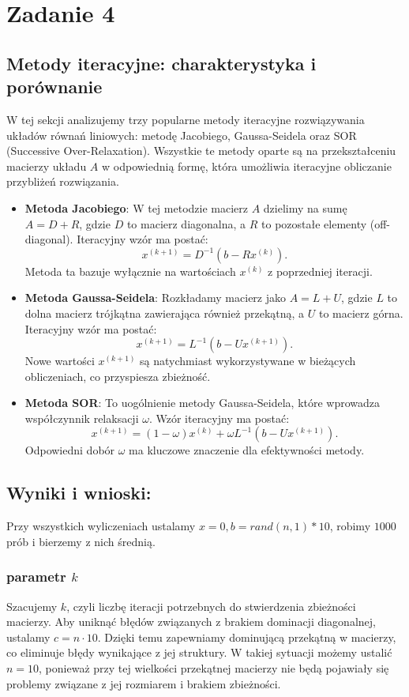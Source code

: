 \section{Zadanie 4}

\subsection{Metody iteracyjne: charakterystyka i porównanie}
W tej sekcji analizujemy trzy popularne metody iteracyjne rozwiązywania układów równań liniowych: metodę Jacobiego, Gaussa-Seidela oraz SOR (Successive Over-Relaxation). Wszystkie te metody oparte są na przekształceniu macierzy układu \( A \) w odpowiednią formę, która umożliwia iteracyjne obliczanie przybliżeń rozwiązania.  
\begin{itemize}
    \item \textbf{Metoda Jacobiego}: W tej metodzie macierz \( A \) dzielimy na sumę \( A = D + R \), gdzie \( D \) to macierz diagonalna, a \( R \) to pozostałe elementy (off-diagonal). Iteracyjny wzór ma postać:  
    \[
    x^{(k+1)} = D^{-1}(b - Rx^{(k)}).
    \]  
    Metoda ta bazuje wyłącznie na wartościach \( x^{(k)} \) z poprzedniej iteracji.  

    \item \textbf{Metoda Gaussa-Seidela}: Rozkładamy macierz jako \( A = L + U \), gdzie \( L \) to dolna macierz trójkątna zawierająca również przekątną, a \( U \) to macierz górna. Iteracyjny wzór ma postać:  
    \[
    x^{(k+1)} = L^{-1}(b - Ux^{(k+1)}).
    \]  
    Nowe wartości \( x^{(k+1)} \) są natychmiast wykorzystywane w bieżących obliczeniach, co przyspiesza zbieżność.  

    \item \textbf{Metoda SOR}: To uogólnienie metody Gaussa-Seidela, które wprowadza współczynnik relaksacji \( \omega \). Wzór iteracyjny ma postać:  
    \[
    x^{(k+1)} = (1-\omega)x^{(k)} + \omega L^{-1}(b - Ux^{(k+1)}).
    \]  
    Odpowiedni dobór \( \omega \) ma kluczowe znaczenie dla efektywności metody.  
\end{itemize}


\subsection{Wyniki i wnioski:} 
Przy wszystkich wyliczeniach ustalamy $x=0, b=rand(n,1) *10$, robimy $1000$ prób i bierzemy z nich średnią.\\
\subsubsection{parametr $k$}
Szacujemy \( k \), czyli liczbę iteracji potrzebnych do stwierdzenia zbieżności macierzy. Aby uniknąć błędów związanych z brakiem dominacji diagonalnej, ustalamy \( c = n \cdot 10 \). Dzięki temu zapewniamy dominującą przekątną w macierzy, co eliminuje błędy wynikające z jej struktury. W takiej sytuacji możemy ustalić \( n = 10 \), ponieważ przy tej wielkości przekątnej macierzy nie będą pojawiały się problemy związane z jej rozmiarem i brakiem zbieżności.

